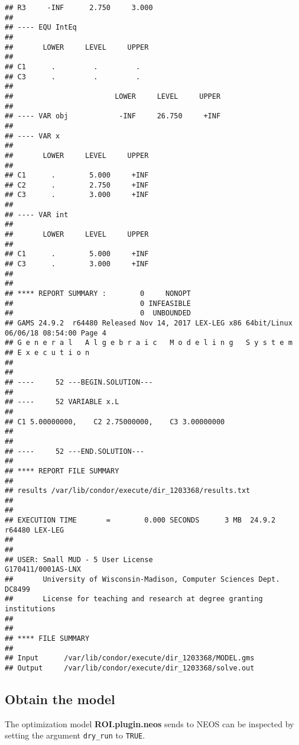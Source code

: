\documentclass[a4paper]{article}\usepackage[]{graphicx}\usepackage[]{color}
\makeatletter
\newenvironment{kframe}{%
 \def\at@end@of@kframe{}%
 \ifinner\ifhmode%
  \def\at@end@of@kframe{\end{minipage}}%
  \begin{minipage}{\columnwidth}%
 \fi\fi%
 \def\FrameCommand##1{\hskip\@totalleftmargin \hskip-\fboxsep
 \colorbox{shadecolor}{##1}\hskip-\fboxsep
     \hskip-\linewidth \hskip-\@totalleftmargin \hskip\columnwidth}%
 \MakeFramed {\advance\hsize-\width
   \@totalleftmargin\z@ \linewidth\hsize
   \@setminipage}}%
 {\par\unskip\endMakeFramed%
 \at@end@of@kframe}
\newenvironment{knitrout}{}{} %
\newcommand{\pkg}[1]{\textbf{#1}}
\newcommand{\code}[1]{\texttt{#1}}
\makeatother
\begin{document}
\begin{footnotesize}
\begin{knitrout}
\begin{kframe}
\begin{verbatim}
## R3     -INF      2.750     3.000      
## 
## ---- EQU IntEq  
## 
##       LOWER     LEVEL     UPPER
## 
## C1      .         .         .         
## C3      .         .         .         
## 
##                        LOWER     LEVEL     UPPER
## 
## ---- VAR obj            -INF     26.750     +INF       
## 
## ---- VAR x  
## 
##       LOWER     LEVEL     UPPER
## 
## C1      .        5.000     +INF       
## C2      .        2.750     +INF       
## C3      .        3.000     +INF       
## 
## ---- VAR int  
## 
##       LOWER     LEVEL     UPPER
## 
## C1      .        5.000     +INF       
## C3      .        3.000     +INF       
## 
## 
## **** REPORT SUMMARY :        0     NONOPT
##                              0 INFEASIBLE
##                              0  UNBOUNDED
## GAMS 24.9.2  r64480 Released Nov 14, 2017 LEX-LEG x86 64bit/Linux 06/06/18 08:54:00 Page 4
## G e n e r a l   A l g e b r a i c   M o d e l i n g   S y s t e m
## E x e c u t i o n
## 
## 
## ----     52 ---BEGIN.SOLUTION---
## 
## ----     52 VARIABLE x.L  
## 
## C1 5.00000000,    C2 2.75000000,    C3 3.00000000
## 
## 
## ----     52 ---END.SOLUTION---
## 
## **** REPORT FILE SUMMARY
## 
## results /var/lib/condor/execute/dir_1203368/results.txt
## 
## 
## EXECUTION TIME       =        0.000 SECONDS      3 MB  24.9.2 r64480 LEX-LEG
## 
## 
## USER: Small MUD - 5 User License                     G170411/0001AS-LNX
##       University of Wisconsin-Madison, Computer Sciences Dept.   DC8499
##       License for teaching and research at degree granting institutions
## 
## 
## **** FILE SUMMARY
## 
## Input      /var/lib/condor/execute/dir_1203368/MODEL.gms
## Output     /var/lib/condor/execute/dir_1203368/solve.out
\end{verbatim}
\end{kframe}
\end{knitrout}
\end{footnotesize}

\subsection{Obtain the model}
The optimization model \pkg{ROI.plugin.neos} sends to NEOS can be
inspected by setting the argument \verb+dry_run+ to \code{TRUE}.
\end{document}
